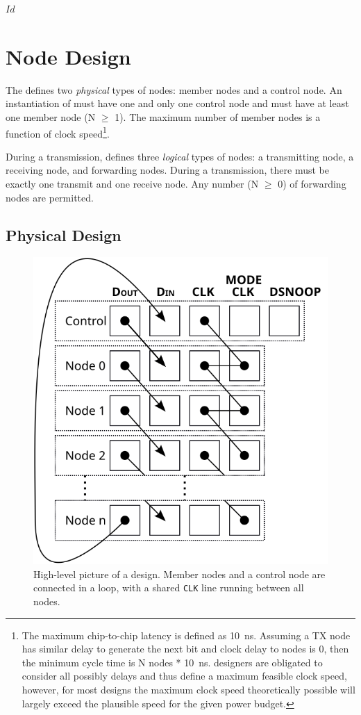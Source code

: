 \svnInfo $Id$

\section{Node Design}
\label{sec:node}
The \bus defines two {\em physical} types of nodes: member nodes and a control
node. An instantiation of \bus must have one and only one control node and
must have at least one member node (N $\geq$ 1). The maximum number of member
nodes is a function of clock speed\footnote{
  The maximum chip-to-chip latency is defined as 10~ns. Assuming a TX node has
similar delay to generate the next bit and clock delay to nodes is 0, then the
minimum cycle time is N nodes * 10~ns. \bus designers are obligated to
consider all possibly delays and thus define a maximum feasible clock speed,
however, for most designs the maximum clock speed theoretically possible will
largely exceed the plausible speed for the given power budget.}.

During a transmission, \bus defines three {\em logical} types of nodes:
a transmitting node, a receiving node, and forwarding nodes. During a
transmission, there must be exactly one transmit and one receive node. Any
number (N $\geq$ 0) of forwarding nodes are permitted.

\subsection{Physical Design}
\label{sec:physical}

\begin{figure}
\begin{center}
\includegraphics[width=0.5\linewidth]{img/stacked_layers}
\end{center}
\caption{High-level picture of a \bus design. Member nodes and a control node
are connected in a loop, with a shared {\tt CLK} line running between all
nodes.}
\label{fig:bus}
\end{figure}

